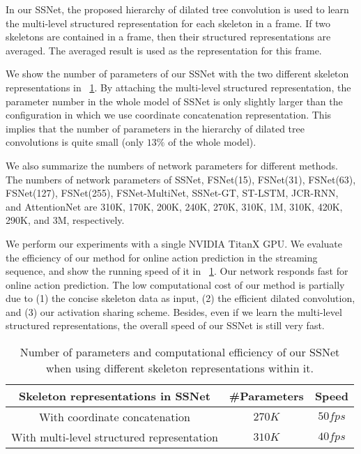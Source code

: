 \documentclass[10pt,twocolumn,letterpaper]{article}
\begin{document}
In our SSNet, the proposed hierarchy of dilated tree convolution is used to learn the multi-level structured representation for each skeleton in a frame.
If two skeletons are contained in a frame, then their structured representations are averaged.
The averaged result is used as the representation for this frame.





We show the number of parameters of our SSNet with the two different skeleton representations in \tablename{~\ref{table:paraAndSpeed}}.
By attaching the multi-level structured representation,
the parameter number in the whole model of SSNet is only slightly larger than the configuration in which we use coordinate concatenation representation.
This implies that the number of parameters in the hierarchy of dilated tree convolutions is quite small (only $13\%$ of the whole model).


We also summarize the numbers of network parameters for different methods.
The numbers of network parameters of
SSNet,  FSNet(15), FSNet(31), FSNet(63), FSNet(127), FSNet(255), FSNet-MultiNet,  SSNet-GT, ST-LSTM, JCR-RNN, and AttentionNet are
310K,   170K,      200K,      240K,      270K,       310K,       1M,              310K,     420K,    290K,    and 3M,      respectively.

We perform our experiments with a single NVIDIA TitanX GPU.
We evaluate the efficiency of our method for online action prediction in the streaming sequence, and show the running speed of it in \tablename{~\ref{table:paraAndSpeed}}.
Our network responds fast for online action prediction. The low computational cost of our method is partially due to (1) the concise skeleton data as input, (2) the efficient dilated convolution, and (3) our activation sharing scheme.
Besides, even if we learn the multi-level structured representations, the overall speed of our SSNet is still very fast.






\begin{table}[h]
\caption{
Number of parameters and computational efficiency of our SSNet when using different skeleton representations within it.
}
\label{table:paraAndSpeed}
\centering
\begin{tabular}{ccc}
\toprule
Skeleton representations in SSNet         & \#Parameters      & Speed    \\
\midrule
With coordinate concatenation                 &  $270K$           &  $50fps$     \\
With multi-level structured representation    &  $310K$           &  $40fps$       \\
\bottomrule
\end{tabular}
\end{table}
\end{document}
